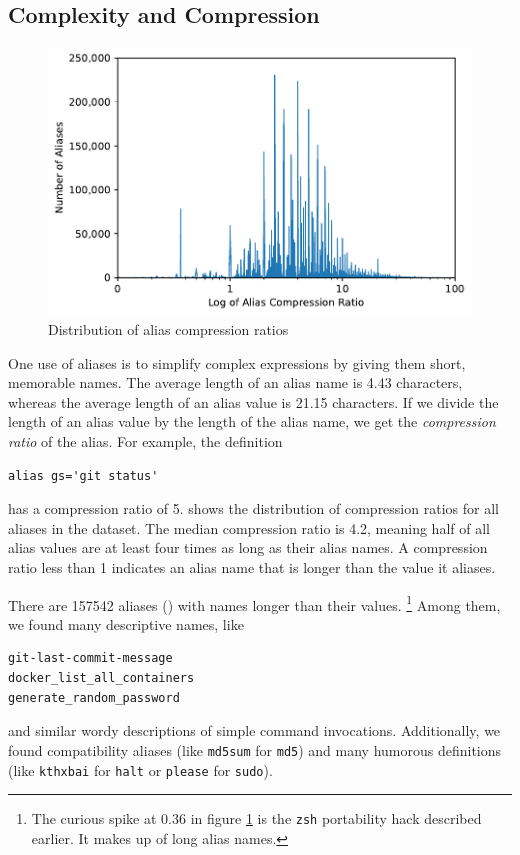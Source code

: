 \subsection{Complexity and Compression}

\begin{figure}
    \centering
    \includegraphics[width=\columnwidth]{compression_dist.pdf}
    \caption{Distribution of alias compression ratios}
    \label{fig:compression}
\end{figure}

One use of aliases is to simplify complex expressions by giving them short, memorable names.
The average length of an alias name is \num{4.43} characters, whereas the average length of an alias value is \num{21.15} characters.
If we divide the length of an alias value by the length of the alias name, we get the \emph{compression ratio} of the alias.
For example, the definition
\begin{verbatim}
alias gs='git status'
\end{verbatim}
has a compression ratio of 5.
 shows the distribution of compression ratios for all aliases in the dataset.
The median compression ratio is 4.2, meaning half of all alias values are at least four times as long as their alias names.
A compression ratio less than 1 indicates an alias name that is longer than the value it aliases. 

There are \num{157542} aliases () with names longer than their values.%
\footnote{The curious spike at 0.36 in figure \cref{fig:compression} is the \texttt{zsh} portability hack described earlier.
It makes up  of long alias names.}
Among them, we found many descriptive names, like
\begin{verbatim}
git-last-commit-message    
docker_list_all_containers
generate_random_password
\end{verbatim}
and similar wordy descriptions of simple command invocations.
Additionally, we found compatibility aliases (like \texttt{md5sum} for \texttt{md5}) and many humorous definitions (like \texttt{kthxbai} for \texttt{halt} or \texttt{please} for \texttt{sudo}).

